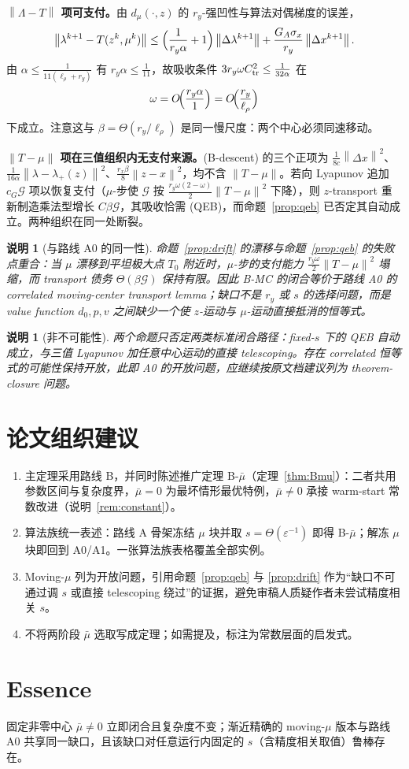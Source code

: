\documentclass[11pt,a4paper,UTF8]{ctexart}
\newtheorem{remark}[theorem]{说明}
\newcommand{\G}{\mathcal G}
\newcommand{\eps}{\varepsilon}
\newcommand{\norm}[1]{\left\|#1\right\|}
\begin{document}
\textbf{$\norm{\Lambda-T}$ 项可支付。}由 $d_\mu(\cdot,z)$ 的 $r_y$-强凹性与算法对偶梯度的误差，
$$
\norm{\lambda^{k+1}-T(z^k,\mu^k)}
\le
\Bigl(\frac1{r_y\alpha}+1\Bigr)\norm{\Delta\lambda^{k+1}}
+\frac{G_A\sigma_x}{r_y}\norm{\Delta x^{k+1}} .
$$
由 $\alpha\le\frac1{11(\ell_\rho+r_y)}$ 有 $r_y\alpha\le\frac1{11}$，故吸收条件
$3r_y\omega C_{\rm tr}^2\le\frac1{32\alpha}$ 在
$$
\omega=O\!\Bigl(\frac{r_y\alpha}{1}\Bigr)
=O\!\Bigl(\frac{r_y}{\ell_\rho}\Bigr)
$$
下成立。注意这与 $\beta=\Theta(r_y/\ell_\rho)$ 是同一慢尺度：两个中心必须同速移动。

\textbf{$\norm{T-\mu}$ 项在三值组织内无支付来源。}(B-descent) 的三个正项为
$\frac1{8c}\norm{\Delta x}^2$、$\frac1{16\alpha}\norm{\lambda-\lambda_+(z)}^2$、$\frac{r_x\beta}8\norm{z-x}^2$，均不含 $\norm{T-\mu}$。若向 Lyapunov 追加 $c_G\G$ 项以恢复支付（$\mu$-步使 $\G$ 按 $\frac{r_y\omega(2-\omega)}2\norm{T-\mu}^2$ 下降），则 $z$-transport 重新制造乘法型增长 $C\beta\G$，其吸收恰需 (QEB)，而命题~\ref{prop:qeb} 已否定其自动成立。两种组织在同一处断裂。

\begin{remark}[与路线 A0 的同一性]
命题~\ref{prop:drift} 的漂移与命题~\ref{prop:qeb} 的失败点重合：当 $\mu$ 漂移到平坦极大点 $T_0$ 附近时，$\mu$-步的支付能力 $\frac{r_y\omega}2\norm{T-\mu}^2$ 塌缩，而 transport 债务 $\Theta(\beta\G)$ 保持有限。因此 B-MC 的闭合等价于路线 A0 的 correlated moving-center transport lemma；缺口不是 $r_y$ 或 $s$ 的选择问题，而是 value function $d_0,p,v$ 之间缺少一个使 $z$-运动与 $\mu$-运动直接抵消的恒等式。
\end{remark}

\begin{remark}[非不可能性]
两个命题只否定两类标准闭合路径：fixed-$s$ 下的 QEB 自动成立，与三值 Lyapunov 加任意中心运动的直接 telescoping。存在 correlated 恒等式的可能性保持开放，此即 A0 的开放问题，应继续按原文档建议列为 theorem-closure 问题。
\end{remark}

\section{论文组织建议}

\begin{enumerate}
  \item 主定理采用路线 B，并同时陈述推广定理 B-$\bar\mu$（定理~\ref{thm:Bmu}）：二者共用参数区间与复杂度界，$\bar\mu=0$ 为最坏情形最优特例，$\bar\mu\neq0$ 承接 warm-start 常数改进（说明~\ref{rem:constant}）。
  \item 算法族统一表述：路线 A 骨架冻结 $\mu$ 块并取 $s=\Theta(\eps^{-1})$ 即得 B-$\bar\mu$；解冻 $\mu$ 块即回到 A0/A1。一张算法族表格覆盖全部实例。
  \item Moving-$\mu$ 列为开放问题，引用命题~\ref{prop:qeb} 与 \ref{prop:drift} 作为“缺口不可通过调 $s$ 或直接 telescoping 绕过”的证据，避免审稿人质疑作者未尝试精度相关 $s$。
  \item 不将两阶段 $\bar\mu$ 选取写成定理；如需提及，标注为常数层面的启发式。
\end{enumerate}

\section*{Essence}

固定非零中心 $\bar\mu\neq0$ 立即闭合且复杂度不变；渐近精确的 moving-$\mu$ 版本与路线 A0 共享同一缺口，且该缺口对任意运行内固定的 $s$（含精度相关取值）鲁棒存在。
\end{document}
